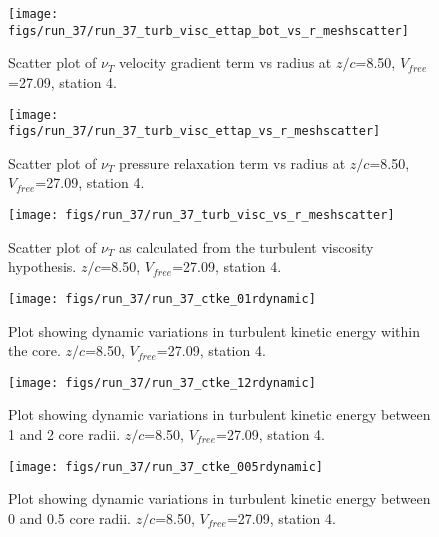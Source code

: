 \begin{figure}[H]
\centering
\texttt{[image: figs/run\_37/run\_37\_turb\_visc\_ettap\_bot\_vs\_r\_meshscatter]}
\caption{Scatter plot of $\nu_T$ velocity gradient term vs radius at $z/c$=8.50, $V_{free}$=27.09, station 4.}
\end{figure}


\begin{figure}[H]
\centering
\texttt{[image: figs/run\_37/run\_37\_turb\_visc\_ettap\_vs\_r\_meshscatter]}
\caption{Scatter plot of $\nu_T$ pressure relaxation term vs radius at $z/c$=8.50, $V_{free}$=27.09, station 4.}
\end{figure}


\begin{figure}[H]
\centering
\texttt{[image: figs/run\_37/run\_37\_turb\_visc\_vs\_r\_meshscatter]}
\caption{Scatter plot of $\nu_T$ as calculated from the turbulent viscosity hypothesis. $z/c$=8.50, $V_{free}$=27.09, station 4.}
\end{figure}


\begin{figure}[H]
\centering
\texttt{[image: figs/run\_37/run\_37\_ctke\_01rdynamic]}
\caption{Plot showing dynamic variations in turbulent kinetic energy within the core. $z/c$=8.50, $V_{free}$=27.09, station 4.}
\end{figure}


\begin{figure}[H]
\centering
\texttt{[image: figs/run\_37/run\_37\_ctke\_12rdynamic]}
\caption{Plot showing dynamic variations in turbulent kinetic energy between 1 and 2 core radii. $z/c$=8.50, $V_{free}$=27.09, station 4.}
\end{figure}


\begin{figure}[H]
\centering
\texttt{[image: figs/run\_37/run\_37\_ctke\_005rdynamic]}
\caption{Plot showing dynamic variations in turbulent kinetic energy between 0 and 0.5 core radii. $z/c$=8.50, $V_{free}$=27.09, station 4.}
\end{figure}



